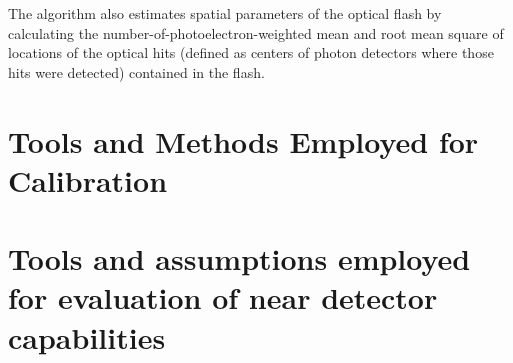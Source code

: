 The algorithm also estimates spatial parameters of the optical flash
by calculating the number-of-photoelectron-weighted mean and 
root mean square of locations of the optical hits
(defined as centers of photon detectors where those hits were detected)
contained in the flash.


\section{Tools and Methods Employed for Calibration }
\label{sec:phys-tools-calib}



\section{Tools and assumptions employed for evaluation of near detector capabilities}
\label{sec:tools-nd-eval}